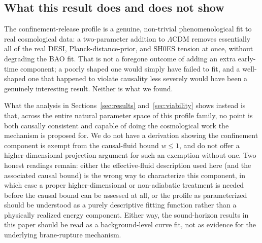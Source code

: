\documentclass[11pt,a4paper,twocolumn]{article}
\begin{document}
\subsection{What this result does and does not show}
The confinement-release profile is a genuine, non-trivial phenomenological fit to real cosmological data: a two-parameter addition to $\Lambda$CDM removes essentially all of the real DESI, Planck-distance-prior, and SH0ES tension at once, without degrading the BAO fit. That is not a foregone outcome of adding an extra early-time component; a poorly shaped one would simply have failed to fit, and a well-shaped one that happened to violate causality less severely would have been a genuinely interesting result. Neither is what we found.

What the analysis in Sections~\ref{sec:results} and~\ref{sec:viability} shows instead is that, across the entire natural parameter space of this profile family, no point is both causally consistent and capable of doing the cosmological work the mechanism is proposed for. We do not have a derivation showing the confinement component is exempt from the causal-fluid bound $w \leq 1$, and do not offer a higher-dimensional projection argument for such an exemption without one. Two honest readings remain: either the effective-fluid description used here (and the associated causal bound) is the wrong way to characterize this component, in which case a proper higher-dimensional or non-adiabatic treatment is needed before the causal bound can be assessed at all, or the profile as parameterized should be understood as a purely descriptive fitting function rather than a physically realized energy component. Either way, the sound-horizon results in this paper should be read as a background-level curve fit, not as evidence for the underlying brane-rupture mechanism.
\end{document}
